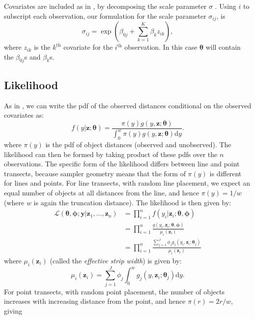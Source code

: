 \documentclass[useAMS,referee,usenatbib]{biom}
\begin{document}
Covariates are included as in \cite{Marques:2003vb}, by decomposing the scale parameter $\sigma$ \cite[see also][]{Marques:2007vm}.  Using $i$ to subscript each observation, our formulation for the scale parameter $\sigma_{ij}$, is
\begin{equation*}
\sigma_{ij} = \exp( \beta_{0j} + \sum_{k=1}^K \beta_k z_{ik}),
\end{equation*}
where $z_{ik}$ is the $k^\text{th}$ covariate for the $i^\text{th}$ observation. In this case $\bm{\theta}$ will contain the $\beta_{0j}$s and $\beta_k$s.

\subsection{Likelihood}
\label{s:likelihood}

As in \cite{Buckland:2004ts}, we can write the pdf of the observed distances conditional on the observed covariates as:
\begin{equation*}
f(y \vert \bm{z}; \bm{\theta}) = \frac{\pi(y)g(y, \bm{z}; \bm{\theta})}{\int_0^w \pi(y)g(y, \bm{z}; \bm{\theta}) \text{d}y}.
\end{equation*}
where $\pi(y)$ is the pdf of object distances (observed and unobserved). The likelihood can then be formed by taking product of these pdfs over the $n$ observations.  The specific form of the likelihood differs between line and point transects, because sampler geometry means that the form of $\pi(y)$ is different for lines and points.  For line transects, with random line placement, we expect an equal number of objects at all distances from the line, and hence $\pi(y)=1/w$ (where $w$ is again the truncation distance).  The likelihood is then given by:
\begin{align*}
\mathcal{L}(\bm{\theta},\bm{\phi}; \mathbf{y} \vert \bm{z}_1, \ldots, \bm{z}_n) &= \prod_{i=1}^n f(y_i \vert \bm{z}_i; \bm{\theta},\bm{\phi})\\
&= \prod_{i=1}^n \frac{g(y_i,\bm{z}_i; \bm{\theta},\bm{\phi})}{\mu_i(\bm{z}_i)}\\
&= \prod_{i=1}^n \frac{\sum_{j=1}^J \phi_j g_j(y_i,\bm{z}_i; \bm{\theta}_j)}{\mu_i(\bm{z}_i)}
\end{align*}
where $\mu_i(\bm{z}_i)$ (called the \textit{effective strip width}) is given by:
\begin{equation}
\label{e:esw}
\mu_{i}(\bm{z}_i) = \sum_{j=1}^J \phi_j \int_0^w  g_j(y,\bm{z}_i; \bm{\theta}_j) \text{d}y.
\end{equation}
For point transects, with random point placement, the number of objects increases with increasing distance from the point, and hence $\pi(r)=2r/w$, giving
\end{document}
